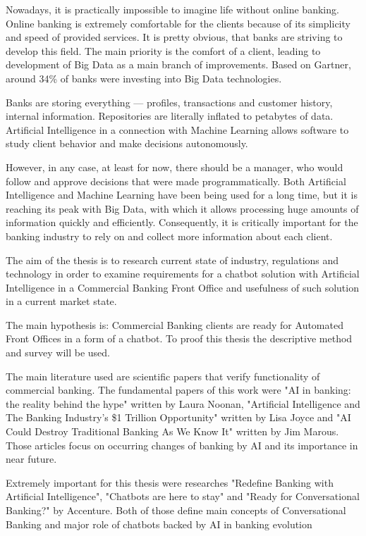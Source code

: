 

Nowadays, it is practically impossible to imagine life without online banking. Online banking is extremely comfortable for the clients because of its simplicity and speed of provided services. 
It is pretty obvious, that banks are striving to develop this field. The main priority is the comfort of a client, leading to development of Big Data as a main branch of improvements. 
Based on Gartner, around 34\% of banks were investing into Big Data technologies. 

Banks are storing everything — profiles, transactions and customer history, internal information. 
Repositories are literally inflated to petabytes of data. 
Artificial Intelligence in a connection with Machine Learning allows software to study client behavior and make decisions autonomously. 

However, in any case, at least for now, there should be a manager, who would follow and approve decisions that were made programmatically. 
Both Artificial Intelligence and Machine Learning have been being used for a long time, but it is reaching its peak with Big Data, with which it allows processing huge amounts of information quickly and efficiently. 
Consequently, it is critically important for the banking industry to rely on and collect more information about each client. 

The aim of the thesis is to research current state of industry, regulations and technology in order to examine requirements for a chatbot solution with Artificial Intelligence in a Commercial Banking Front Office and usefulness of such solution in a current market state.

The main hypothesis is: Commercial Banking clients are ready for Automated Front Offices in a form of a chatbot.
To proof this thesis the descriptive method and survey will be used.

The main literature used are scientific papers that verify functionality of commercial banking. 
The fundamental papers of this work were "AI in banking: the reality behind the hype" written by Laura Noonan, "Artificial Intelligence and The Banking Industry’s \$1 Trillion Opportunity" written by Lisa Joyce and "AI Could Destroy Traditional Banking As We Know It" written by Jim Marous.
Those articles focus on occurring changes of banking by AI and its importance in near future. 

Extremely important for this thesis were researches "Redefine Banking with Artificial Intelligence", "Chatbots are here to stay" and "Ready for Conversational Banking?" by Accenture.
Both of those define main concepts of Conversational Banking and major role of chatbots backed by AI in banking evolution 

